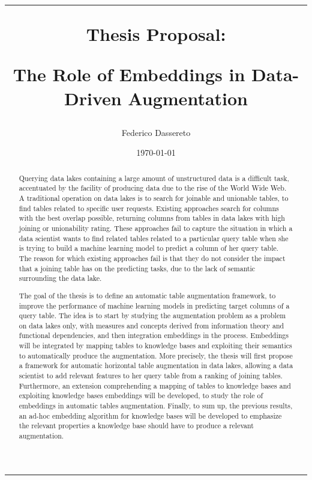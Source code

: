 \documentclass[a4paper,11pt, english]{article}
\title{\vspace{0cm}
\hrule
\vspace{1cm}
\centerline{\LARGE{Thesis Proposal:}}
\vspace{0.5cm}
\centerline{\LARGE {\bf The Role of Embeddings in Data-Driven Augmentation}}
}
\author{Federico Dassereto}
\date{\today}
\begin{document}
\maketitle
\hrule 
\vspace{1cm}

\begin{abstract}
    Querying data lakes containing a large amount of unstructured data is a difficult task, accentuated by the facility of producing data due to the rise of the World Wide Web. A traditional operation on data lakes is to search for joinable and unionable tables, to find tables related to specific user requests. Existing approaches search for columns with the best overlap possible, returning columns from tables in data lakes with high joining or unionability rating. These approaches fail to capture the situation in which a data scientist wants to find related tables related to a particular query table when she is trying to build a machine learning model to predict a column of her query table. The reason for which existing approaches fail is that they do not consider the impact that a joining table has on the predicting tasks, due to the lack of semantic surrounding the data lake. 

    The goal of the thesis is to define an automatic table augmentation framework, to improve the performance of machine learning models in predicting target columns of a query table. The idea is to start by studying the augmentation problem as a problem on data lakes only, with measures and concepts derived from information theory and functional dependencies, and then integration embeddings in the process. Embeddings will be integrated by mapping tables to knowledge bases and exploiting their semantics to automatically produce the augmentation. More precisely, the thesis will first propose a framework for automatic horizontal table augmentation in data lakes, allowing a data scientist to add relevant features to her query table from a ranking of joining tables. Furthermore, an extension comprehending a mapping of tables to knowledge bases and exploiting knowledge bases embeddings will be developed, to study the role of embeddings in automatic tables augmentation. Finally, to sum up, the previous results, an ad-hoc embedding algorithm for knowledge bases will be developed to emphasize the relevant properties a knowledge base should have to produce a relevant augmentation.
\end{abstract}














\printbibliography
\end{document}
